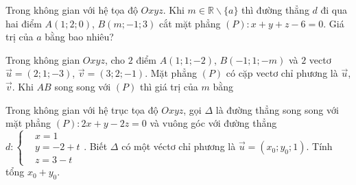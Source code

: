 \begin{bt}%
	Trong không gian với hệ tọa độ $Oxyz$. Khi $m\in\mathbb{R}\backslash\{a\}$ thì đường thẳng $d$ đi qua hai điểm $A(1;2;0)$, $B(m;-1;3)$ cắt mặt phẳng $(P)  \colon x+y+z-6=0$. Giá trị của $a$ bằng bao nhiêu?
\end{bt}

\begin{bt}%
	Trong không gian $Oxyz$, cho $2$ điểm $A(1;1;-2)$, $B(-1;1;-m)$ và $2$ vectơ $\overrightarrow{u}=(2;1;-3)$, $\overrightarrow{v}=(3;2;-1)$.  Mặt phẳng $(P)$ có cặp vectơ chỉ phương là $\overrightarrow{u}$, $\overrightarrow{v}$. Khi $AB$ song song với $(P)$ thì giá trị của $m$ bằng
\end{bt}

\begin{bt}%
	Trong không gian với hệ trục tọa độ $Oxyz$, gọi $\Delta$ là đường thẳng song song với mặt phẳng $(P)\colon 2 x+y-2 z=0$ và vuông góc với đường thẳng $d\colon \left\{\begin{aligned}&x=1 \\& y=-2+t\\&z=3-t
\end{aligned}\right.$. Biết $\Delta$ có một véctơ chỉ phương là $\overrightarrow{u}=\left(x_0; y_0; 1\right)$. Tính tổng $x_0+y_0$.
\end{bt}

